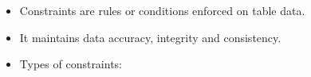 \setlength{\columnsep}{3pt}
\begin{flushleft}

	\begin{itemize}
		\item Constraints are rules or conditions enforced on table data.
		\item It maintains data accuracy, integrity and consistency. 
		\item Types of constraints:

	\end{itemize}
	
	
\end{flushleft}

\newpage

